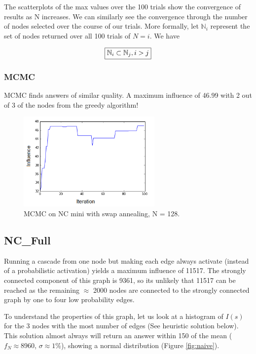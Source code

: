 \documentclass{article}
\begin{document}
	
	The scatterplots of the max values over the 100 trials show the convergence of results as N increases. We can similarly see the convergence through the number of nodes selected over the course of our trials. More formally, let $\mathbb{N}_i$ represent the set of nodes returned over all 100 trials of $N=i$. We have
	
	\begin{equation}
		\boxed{
			\mathbb{N}_i \subset \mathbb{N}_j, i > j\\
		}
	\end{equation}
	
	\subsubsection{MCMC}
	MCMC finds answers of similar quality. A maximum influence of 46.99 with 2 out of 3 of the nodes from the greedy algorithm!
		\begin{figure}[h!]
			\centering
			\includegraphics[width=70mm]{mcmc_mini.png}
			\caption{MCMC on NC mini with swap annealing, N = 128.}
			\label{fig:mcmc_mini}
		\end{figure} 
		
	
	
	\subsection{NC\_Full}
	
	Running a cascade from one node but making each edge always activate (instead of a probabilistic activation) yields a maximum influence of 11517. The strongly connected component of this graph is 9361, so its unlikely that 11517 can be reached as the remaining $\approx$ 2000 nodes are connected to the strongly connected graph by one to four low probability edges.
	
	To understand the properties of this graph, let us look at a histogram of $I(s)$ for the 3 nodes with the most number of edges (See heuristic solution below). This solution almost always will return an answer within 150 of the mean ($f_N \approx 8960$, $\sigma \approx 1\%$), showing a normal distribution (Figure \ref{fig:naive}).
	
\end{document}
